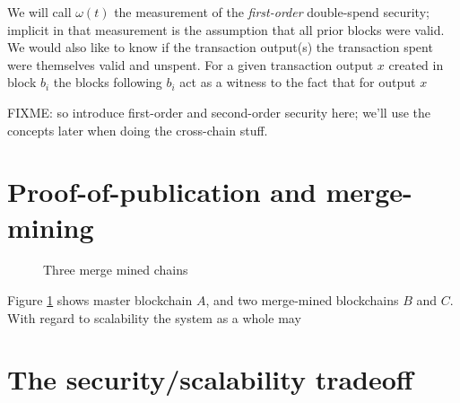 \documentclass{article}
\begin{document}
We will call $\omega(t)$ the measurement of the \emph{first-order} double-spend
security; implicit in that measurement is the assumption that all prior blocks
were valid. We would also like to know if the transaction output(s) the
transaction spent were themselves valid and unspent. For a given transaction
output $x$ created in block $b_i$ the blocks following $b_i$ act as a witness
to the fact that for output $x$ 


FIXME: so introduce first-order and second-order security here; we'll use the
concepts later when doing the cross-chain stuff.


\section{Proof-of-publication and merge-mining}

\begin{figure}
    \centering
    
    \caption{Three merge mined chains}
    \label{fig:three-merge-mined-chains}
\end{figure}

Figure \ref{fig:three-merge-mined-chains} shows master blockchain $A$, and
two merge-mined blockchains $B$ and $C$. With regard to scalability the system as a whole may 


\cite{disentangling-crypto-coin-mining}


\section{The security/scalability tradeoff}






\end{document}
